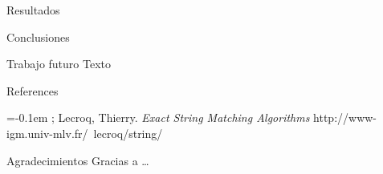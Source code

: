 \documentclass[a0paper, portrait]{baposter}
\begin{document}
\begin{poster}
  \begin{posterbox}[column=1, name=index, below=semantic]{Resultados} {
    
    }
  \end{posterbox}

  \begin{posterbox}[name=interact, column=1, row=0]{Conclusiones} {
    
  }
  \end{posterbox}

  
  \begin{posterbox}[column=1, name=future, below=interact] {Trabajo futuro} {
    Texto
  }
  \end{posterbox}
  
  \begin{posterbox}[column=1, name=ref, below=future] {References} {
      \small {
      \begin{flushleft}
        
        \renewcommand{\section}[2]{\vskip 0.05em}
        \begin{thebibliography}{7}\itemsep=-0.1em 
          \setlength{\baselineskip}{0.4em}
            ; {\sc Lecroq, Thierry}. {\it Exact String Matching Algorithms}  
            \newblock http://www-igm.univ-mlv.fr/~lecroq/string/      
        \end{thebibliography}
        \vspace{0.3em}       
      \end{flushleft}
      }
    }
  \end{posterbox}

  \begin{posterbox}[column=2, name=credits, below=ref] {Agradecimientos} {
      Gracias a \ldots
    }
  \end{posterbox}

\end{poster}
\end{document}
